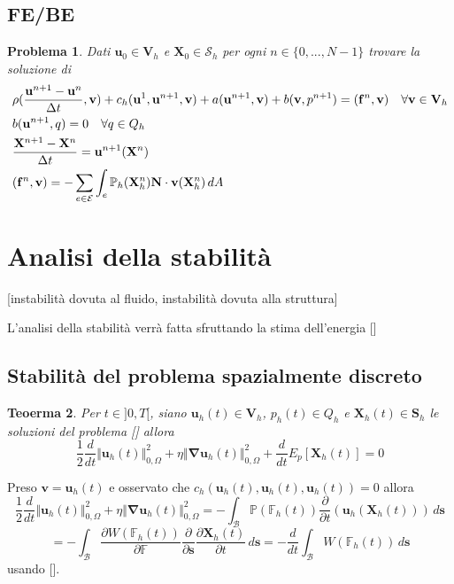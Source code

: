 \documentclass{book}
\newtheorem{theorem}{Teoerma}[section]
\newtheorem{problem}[theorem]{Problema}
\newenvironment{proof}[1][Dimostrazione]{\begin{trivlist}
\item[\hskip \labelsep {\bfseries #1}]}{\end{trivlist}}
\newcommand{\Nabla}{\boldsymbol{\nabla}}
\begin{document}
\subsection{FE/BE}
\begin{problem}
Dati $\mathbf{u}_0\in\mathbf{V}_h$ e  $\mathbf{X}_0\in\mathcal{S}_h$ per ogni $n\in\{0,...,N-1\}$ trovare la soluzione di
\begin{equation}
\begin{aligned}
&\rho(\frac{\mathbf{u}^{n+1}-\mathbf{u}^{n}}{\Delta t}, \mathbf{v}) + c_h(\mathbf{u}^{1},\mathbf{u}^{n+1},\mathbf{v}) + a(\mathbf{u}^{n+1},\mathbf{v}) + b(\mathbf{v},p^{n+1}) = \ps{\mathbf{f}^{n}}{\mathbf{v}} \quad \forall\mathbf{v}\in\mathbf{V}_h\\
&b(\mathbf{u}^{n+1},q)=0 \quad \forall q\in Q_h\\
&\frac{\mathbf{X}^{n+1}-\mathbf{X}^{n}}{\Delta t} = \mathbf{u}^{n+1}(\mathbf{X}^{n})\\
&\ps{\mathbf{f}^{n}}{\mathbf{v}}=-\sum_{e\in\mathcal{E}}\int_e\mathbb{P}_h(\mathbf{X}_h^{n})\mathbf{N}\cdot\mathbf{v}(\mathbf{X}^{n}_h)\,dA\\
\end{aligned}
\end{equation}
\end{problem}

\section{Analisi della stabilità}

[instabilità dovuta al fluido, instabilità dovuta alla struttura]

L'analisi della stabilità verrà fatta sfruttando la stima dell'energia []

\subsection{Stabilità del problema spazialmente discreto}

\begin{theorem}
Per $t\in]0,T[$, siano $\mathbf{u}_h(t)\in\mathbf{V}_h$, $p_h(t)\in Q_h$ e $\mathbf{X}_h(t)\in\mathbf{S}_h$ le soluzioni del problema [] allora
$$\frac{1}{2}\frac{d}{dt}\Vert\mathbf{u}_h(t)\Vert^2_{0,\Omega}+\eta\Vert\Nabla\mathbf{u}_h(t)\Vert^2_{0,\Omega}+\frac{d}{dt}E_p[\mathbf{X}_h(t)]=0$$
\end{theorem}
\begin{proof}
Preso $\mathbf{v}=\mathbf{u}_h(t)$ e osservato che $c_h(\mathbf{u}_h(t),\mathbf{u}_h(t),\mathbf{u}_h(t))=0$ allora
$$\frac{1}{2}\frac{d}{dt}\Vert\mathbf{u}_h(t)\Vert^2_{0,\Omega}+\eta\Vert\Nabla\mathbf{u}_h(t)\Vert^2_{0,\Omega} = -\int_{\mathcal{B}}\mathbb{P}(\mathbb{F}_h(t))\frac{\partial}{\partial t}(\mathbf{u}_h(\mathbf{X}_h(t)))\,d\mathbf{s}$$
$$=-\int_{\mathcal{B}}\frac{\partial W(\mathbb{F}_h(t))}{\partial \mathbb{F}}\frac{\partial}{\partial \mathbf{s}}\frac{\partial\mathbf{X}_h(t)}{\partial t}\,d\mathbf{s}=-\frac{d}{dt}\int_{\mathcal{B}}W(\mathbb{F}_h(t))\,d\mathbf{s}$$
usando [].
\end{proof}
\end{document}
